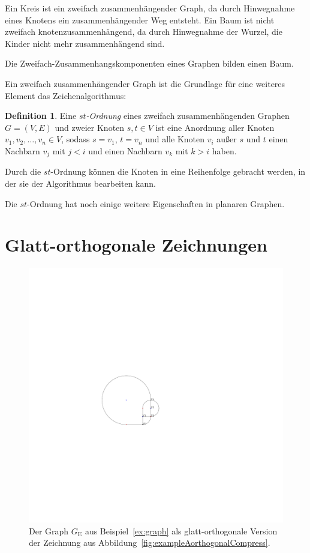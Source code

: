 \documentclass[a4paper]{scrreprt}
\theoremstyle{definition}
\newtheorem{definition}[satz]{Definition}
\begin{document}
Ein Kreis ist ein zweifach zusammenhängender Graph, da durch Hinwegnahme eines Knotens ein zusammenhängender Weg entsteht. Ein Baum ist nicht  zweifach knotenzusammenhängend, da durch Hinwegnahme der Wurzel, die Kinder nicht mehr zusammenhängend sind.

Die Zweifach-Zusammenhangskomponenten eines Graphen bilden einen Baum.

Ein zweifach zusammenhängender Graph ist die Grundlage für eine weiteres Element das Zeichenalgorithmus:

\begin{definition}
  Eine \emph{$st$-Ordnung} eines zweifach zusammenhängenden Graphen $G = (V, E)$ und zweier Knoten $s, t \in V$ ist eine Anordnung aller Knoten $v_1, v_2, \dots, v_n \in V$, sodass $s = v_1$, $t = v_n$ und alle Knoten $v_i$ außer $s$ und $t$  einen Nachbarn $v_j$ mit $j < i$ und einen Nachbarn $v_k$ mit $k > i$ haben.
\end{definition}

Durch die $st$-Ordnung können die Knoten in eine Reihenfolge gebracht werden, in der sie der Algorithmus bearbeiten kann.

Die $st$-Ordnung hat noch einige weitere Eigenschaften in planaren Graphen.





\section{Glatt-orthogonale Zeichnungen}

\cite{bekos-13}

\begin{figure}[h]
  \centering
  \includegraphics{exampleA_smooth}
  \caption{Der Graph $G_\text{E}$ aus Beispiel~\ref{ex:graph} als glatt-orthogonale Version der Zeichnung aus Abbildung~\ref{fig:exampleAorthogonalCompress}.}
  \label{fig:exampleAsmooth}
\end{figure}
\end{document}
